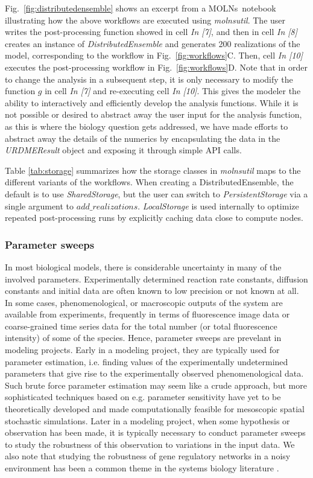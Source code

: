\documentclass[final,leqno,onefignum,onetabnum]{siamltex1213}
\def\packagename {MOLNs}
\begin{document}
Fig.~\ref{fig:distributedensemble} shows an excerpt from a \packagename~notebook illustrating how the above workflows are executed using \emph{molnsutil}. The user writes the post-processing function showed in cell \emph{In [7]}, and then in cell \emph{In [8]} creates an instance of \emph{DistributedEnsemble} and generates 200 realizations of the model, corresponding to the workflow in Fig.~\ref{fig:workflows}C.  Then, cell \emph{In [10]} executes the post-processing workflow in  Fig.~\ref{fig:workflows}D. Note that in order to change the analysis in a subsequent step, it is only necessary to modify the function $g$ in cell \emph{In [7]} and re-executing cell \emph{In [10]}. This gives the modeler the ability to interactively and efficiently develop the analysis functions. While it is not possible or desired to abstract away the user input for the analysis function, as this is where the biology question gets addressed, we have made efforts to abstract away the details of the numerics by encapsulating the data in the \emph{URDMEResult} object and exposing it through simple API calls. 
 
Table \ref{tab:storage} summarizes how the storage classes in \emph{molnsutil} maps to the different variants of the workflows. When creating a DistributedEnsemble, the default is to use \emph{SharedStorage}, but the user can switch to \emph{PersistentStorage} via a single argument to $add\_realizations.$  \emph{LocalStorage} is used internally to optimize repeated post-processing runs by explicitly caching data close to compute nodes.  


\subsubsection{Parameter sweeps}
\label{sec:parametersweeps}
In most biological models, there is considerable uncertainty in many of the involved parameters. Experimentally determined reaction rate constants, diffusion constants and initial data are often known to low precision or not known at all. In some cases, phenomenological, or macroscopic outputs of the system are available from experiments, frequently in terms of fluorescence image data or coarse-grained time series data for the total number (or total fluorescence intensity) of some of the species. Hence, parameter sweeps are prevelant in modeling projects. Early in a modeling project, they are typically used for parameter estimation, i.e. finding values of the experimentally undetermined parameters that give rise to the experimentally observed phenomenological data. Such brute force parameter estimation may seem like a crude approach, but more sophisticated techniques based on e.g. parameter sensitivity have yet to be theoretically developed and made computationally feasible for mesoscopic spatial stochastic simulations. Later in a modeling project, when some hypothesis or observation has been made, it is typically necessary to conduct parameter sweeps to study the robustness of this observation to variations in the input data. We also note that studying the robustness of gene regulatory networks in a noisy environment has been a common theme in the systems biology literature \cite{12237400, Sturrock2013, lawson2013}.
\end{document}
